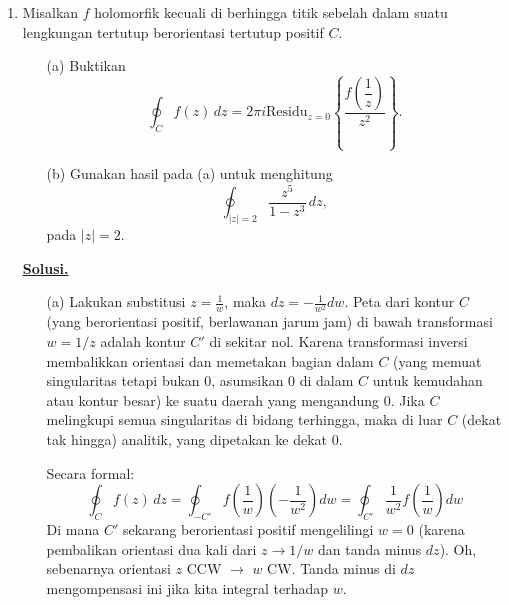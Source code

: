 \documentclass[12pt,twoside]{article}
\newenvironment{solution}
{
	\par\noindent\textbf{\underline{Solusi.}}\\
}
{
	\par
}
\begin{document}
\begin{enumerate}
\begin{solution}
\begin{enumerate}
                  Untuk memeriksa \textbf{bebas afin}, misalkan $\sum_{i=1}^4 c_i v_i = \mathbf{0}$ dan $\sum_{i=1}^4 c_i = 0$.
                  \[ c_1(1,0,0,0) + c_2(0,1,0,0) + c_3(0,0,1,0) + c_4(0,0,0,0) = (0,0,0,0) \]
                  Diperoleh $c_1=0, c_2=0, c_3=0$.
                  Dari syarat jumlah koefisien:
                  \[ 0+0+0+c_4=0 \implies c_4=0. \]
                  Karena $c_1=c_2=c_3=c_4=0$, maka keempat vektor tersebut bebas afin.
          \end{enumerate}
        \end{solution}

  \item Misalkan $f$ holomorfik kecuali di berhingga titik sebelah dalam suatu lengkungan tertutup berorientasi tertutup positif $C$.
        \begin{enumerate}
          \item [(a)] Buktikan \[\oint_{C}f(z)\,dz=2\pi i\text{Residu}_{z=0}\left\lbrace\dfrac{f\left(\dfrac{1}{z}\right)}{z^2}\right\rbrace.\]
          \item[(b)] Gunakan hasil pada (a) untuk menghitung \[\oint_{|z|=2}\dfrac{z^5}{1-z^3}\,dz,\]
                pada $|z|=2$.
        \end{enumerate}
        \begin{solution}
          \vspace*{-1cm}
          \begin{enumerate}
            \item[(a)] Lakukan substitusi $z = \frac{1}{w}$, maka $dz = -\frac{1}{w^2} dw$.
                  Peta dari kontur $C$ (yang berorientasi positif, berlawanan jarum jam) di bawah transformasi $w=1/z$ adalah kontur $C'$ di sekitar nol.
                  Karena transformasi inversi membalikkan orientasi dan memetakan bagian dalam $C$ (yang memuat singularitas tetapi bukan 0, asumsikan 0 di dalam $C$ untuk kemudahan atau kontur besar) ke suatu daerah yang mengandung 0. Jika $C$ melingkupi semua singularitas di bidang terhingga, maka di luar $C$ (dekat tak hingga) analitik, yang dipetakan ke dekat 0.

                  Secara formal:
                  \[
                    \oint_C f(z)\,dz = \oint_{-C'} f\left(\frac{1}{w}\right) \left(-\frac{1}{w^2}\right) dw = \oint_{C'} \frac{1}{w^2} f\left(\frac{1}{w}\right) dw
                  \]
                  Di mana $C'$ sekarang berorientasi positif mengelilingi $w=0$ (karena pembalikan orientasi dua kali dari $z \to 1/w$ dan tanda minus $dz$).
                  Oh, sebenarnya orientasi $z$ CCW $\to$ $w$ CW. Tanda minus di $dz$ mengompensasi ini jika kita integral terhadap $w$.


\end{enumerate}
\end{solution}
\end{enumerate}
\end{document}
